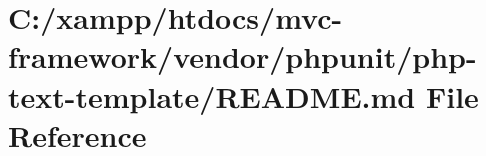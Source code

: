 \hypertarget{vendor_2phpunit_2php-text-template_2_r_e_a_d_m_e_8md}{}\section{C\+:/xampp/htdocs/mvc-\/framework/vendor/phpunit/php-\/text-\/template/\+R\+E\+A\+D\+ME.md File Reference}
\label{vendor_2phpunit_2php-text-template_2_r_e_a_d_m_e_8md}
